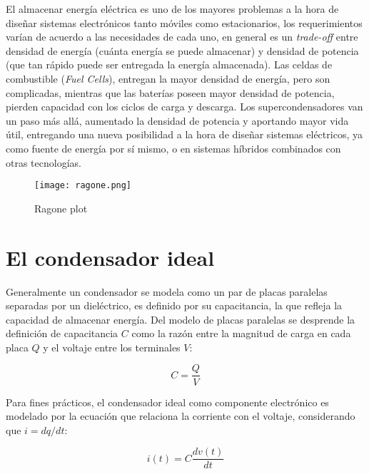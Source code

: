 El almacenar energía eléctrica es uno de los mayores problemas a la hora de diseñar sistemas electrónicos tanto móviles como estacionarios, los requerimientos varían de acuerdo a las necesidades de cada uno, en general es un \textit{trade-off} entre densidad de energía (cuánta energía se puede almacenar) y densidad de potencia (que tan rápido puede ser entregada la energía almacenada). Las celdas de combustible (\textit{Fuel Cells}), entregan la mayor densidad de energía, pero son complicadas, mientras que las baterías poseen mayor densidad de potencia, pierden capacidad con los ciclos de carga y descarga. Los supercondensadores van un paso más allá, aumentado la densidad de potencia y aportando mayor vida útil, entregando una nueva posibilidad a la hora de diseñar sistemas eléctricos, ya como fuente de energía por sí mismo, o en sistemas híbridos combinados con otras tecnologías\citep{Thounthong2009}.

\begin{figure}
	\centering
	\texttt{[image: ragone.png]}
	\label{fig:ragone}
	\caption{Ragone plot}
\end{figure}

\section{El condensador ideal}
Generalmente un condensador se modela como un par de placas paralelas separadas por un dieléctrico, es definido por su capacitancia, la que refleja la capacidad de almacenar energía. Del modelo de placas paralelas se desprende la definición de capacitancia $C$ como la razón entre la magnitud de carga en cada placa $Q$ y el voltaje entre los terminales $V$:

\begin{equation}
	C = \frac{Q}{V}
\end{equation}

Para fines prácticos, el condensador ideal como componente electrónico es modelado por la ecuación que relaciona la corriente con el voltaje, considerando que $i = dq/dt$:

\begin{equation}
	i(t) = C \frac{dv(t)}{dt}
\end{equation}

